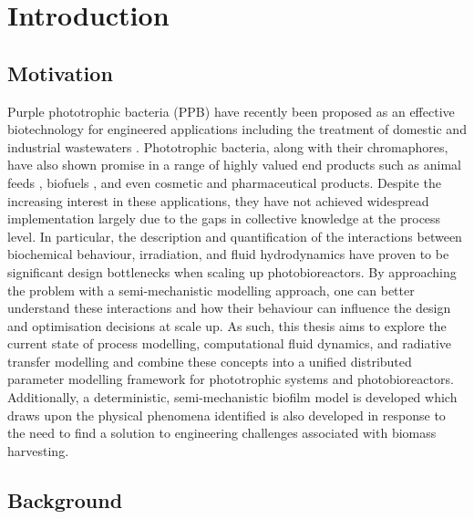\chapter[Introduction]{Introduction}
\label{chap:chap1}
\section{Motivation}
\label{sec:chap1-motivation}
Purple phototrophic bacteria (PPB) have recently been proposed as an effective biotechnology for engineered applications including the treatment of domestic \cite{Hulsen2016} and industrial wastewaters \cite{Hulsen2018}. Phototrophic bacteria, along with their chromaphores, have also shown promise in a range of highly valued end products such as animal feeds \cite{Sun2016}, biofuels \cite{Adessi2014}, and even cosmetic and pharmaceutical products\cite{Liu2013, Wang2018}. Despite the increasing interest in these applications, they have not achieved widespread implementation largely due to the gaps in collective knowledge at the process level. In particular, the description and quantification of the interactions between biochemical behaviour, irradiation, and fluid hydrodynamics have proven to be significant design bottlenecks when scaling up photobioreactors. 
\skippingparagraph
\noindent By approaching the problem with a semi-mechanistic modelling approach, one can better understand these interactions and how their behaviour can influence the design and optimisation decisions at scale up. As such, this thesis aims to explore the current state of process modelling, computational fluid dynamics, and radiative transfer modelling and combine these concepts into a unified distributed parameter modelling framework for phototrophic systems and photobioreactors.  Additionally, a deterministic, semi-mechanistic biofilm model is developed which draws upon the physical phenomena identified is also developed in response to the need to find a solution to engineering challenges associated with biomass harvesting. 





\newpage
\section{Background}
\label{sec:chap1-background}
